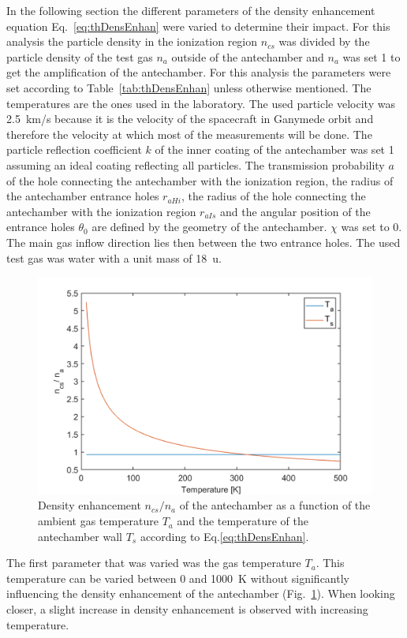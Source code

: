 	In the following section the different parameters of the density enhancement equation Eq.~\eqref{eq:thDensEnhan} were varied to determine their impact. For this analysis the particle density in the ionization region $n_{cs}$ was divided by the particle density of the test gas $n_a$ outside of the antechamber and $n_a$ was set 1 to get the amplification of the antechamber. For this analysis the parameters were set according to Table~\ref{tab:thDensEnhan} unless otherwise mentioned. The temperatures are the ones used in the laboratory. The used particle velocity was 2.5~km/s because it is the velocity of the spacecraft in Ganymede orbit and therefore the velocity at which most of the measurements will be done. The particle reflection coefficient $k$ of the inner coating of the antechamber was set 1 assuming an ideal coating reflecting all particles. The transmission probability $a$ of the hole connecting the antechamber with the ionization region, the radius of the antechamber entrance holes $r_{aHi}$, the radius of the hole connecting the antechamber with the ionization region $r_{aIs}$ and the angular position of the entrance holes $\theta_0$ are defined by the geometry of the antechamber. $\chi$ was set to 0\degree. The main gas inflow direction lies then between the two entrance holes. The used test gas was water with a unit mass of 18~u.
	\begin{figure}[H] %
		\centering
		\includegraphics[width= .7\textwidth]{Bilder/Ta_Ts.png}
		\caption{Density enhancement $n_{cs}/n_a$ of the antechamber as a function of the ambient gas temperature $T_a$ and the temperature of the antechamber wall $T_s$ according to Eq.\eqref{eq:thDensEnhan}.}
		\label{th:densEnhTaTs}
	\end{figure}
	The first parameter that was varied was the gas temperature $T_a$. This temperature can be varied between 0 and 1000~K without significantly influencing the density enhancement of the antechamber (Fig.~\ref{th:densEnhTaTs}). When looking closer, a slight increase in density enhancement is observed with increasing temperature.\\
